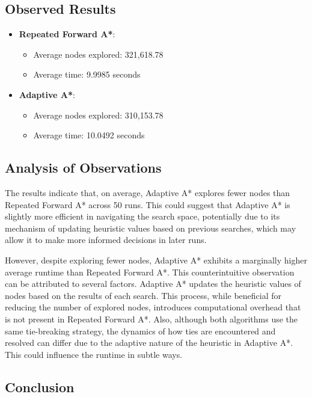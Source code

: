 \documentclass{article}
\begin{document}
\subsection{Observed Results}

\begin{itemize}
    \item \textbf{Repeated Forward A*}:
    \begin{itemize}
        \item Average nodes explored: 321,618.78
        \item Average time: 9.9985 seconds
    \end{itemize}
    \item \textbf{Adaptive A*}:
    \begin{itemize}
        \item Average nodes explored: 310,153.78
        \item Average time: 10.0492 seconds
    \end{itemize}
\end{itemize}

\subsection{Analysis of Observations}

The results indicate that, on average, Adaptive A* explores fewer nodes than Repeated Forward A* across 50 runs. This could suggest that Adaptive A* is slightly more efficient in navigating the search space, potentially due to its mechanism of updating heuristic values based on previous searches, which may allow it to make more informed decisions in later runs.

However, despite exploring fewer nodes, Adaptive A* exhibits a marginally higher average runtime than Repeated Forward A*. This counterintuitive observation can be attributed to several factors. Adaptive A* updates the heuristic values of nodes based on the results of each search. This process, while beneficial for reducing the number of explored nodes, introduces computational overhead that is not present in Repeated Forward A*. Also, although both algorithms use the same tie-breaking strategy, the dynamics of how ties are encountered and resolved can differ due to the adaptive nature of the heuristic in Adaptive A*. This could influence the runtime in subtle ways.

\subsection{Conclusion}
\end{document}
